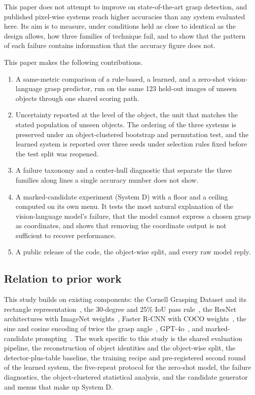 \documentclass[12pt,letterpaper]{article}
\begin{document}
This paper does not attempt to improve on state-of-the-art grasp
detection, and published pixel-wise systems reach higher accuracies than
any system evaluated here. Its aim is to measure, under conditions held
as close to identical as the design allows, how three families of
technique fail, and to show that the pattern of each failure contains
information that the accuracy figure does not.

This paper makes the following contributions.
\begin{enumerate}
\item A same-metric comparison of a rule-based, a learned, and a
zero-shot vision-language grasp predictor, run on the same 123 held-out
images of unseen objects through one shared scoring path.
\item Uncertainty reported at the level of the object, the unit that matches the stated population of unseen objects. The ordering of the three systems is preserved under an object-clustered bootstrap and permutation test, and the learned system is reported over
three seeds under selection rules fixed before the test split was
reopened.
\item A failure taxonomy and a center-hull diagnostic that separate the
three families along lines a single accuracy number does not show.
\item A marked-candidate experiment (System D) with a floor and a
ceiling computed on its own menu. It tests the most natural explanation of the vision-language model's
failure, that the model cannot express a chosen grasp as coordinates,
and shows that removing the coordinate output is not sufficient to
recover performance.
\item A public release of the code, the object-wise split, and every
raw model reply.
\end{enumerate}


\subsection{Relation to prior work}

This study builds on existing components: the Cornell Grasping Dataset
and its rectangle representation~\cite{jiang2011}, the 30-degree and
25\% IoU pass rule~\cite{lenz2015}, the ResNet architectures with
ImageNet weights~\cite{he2016}, Faster R-CNN with COCO
weights~\cite{ren2015}, the sine and cosine encoding of twice the grasp
angle~\cite{redmon2015,morrison2018}, GPT-4o~\cite{openai2024}, and
marked-candidate prompting~\cite{yang2024}. The work specific to this
study is the shared evaluation pipeline, the reconstruction of object
identities and the object-wise split, the detector-plus-table baseline,
the training recipe and pre-registered second round of the learned
system, the five-repeat protocol for the zero-shot model, the failure
diagnostics, the object-clustered statistical analysis, and the
candidate generator and menus that make up System D.
\end{document}
